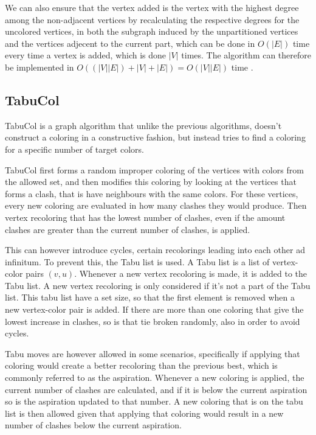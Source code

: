\documentclass[a4paper]{article}
\begin{document}
We can also ensure that the vertex added is the vertex with the highest degree among
the non-adjacent vertices by recalculating the respective degrees for the
uncolored vertices, in both the subgraph induced by the unpartitioned vertices and the vertices 
adjecent to the current part, which can be done in $O(|E|)$ time every time a vertex is
added, which is done $|V|$ times. The algorithm can therefore be implemented in
$O((|V||E|)+|V|+|E|) = O(|V||E|)$ time \cite{Constructive}.

\subsection{TabuCol}

TabuCol is a graph algorithm that unlike the previous algorithms, doesn't
construct a coloring in a constructive fashion, but instead tries to find a
coloring for a specific number of target colors.

TabuCol first forms a random improper coloring of the vertices with colors from
the allowed set, and then modifies this coloring by looking at the vertices that
forms a clash, that is have neighbours with the same colors. For these vertices,
every new coloring are evaluated in how many clashes they would produce. Then
vertex recoloring that has the lowest number of clashes, even if the amount
clashes are greater than the current number of clashes, is applied.

This can however introduce cycles, certain recolorings leading into each other
ad infinitum. To prevent this, the Tabu list is used. A Tabu list is a list of
vertex-color pairs $(v,u)$. Whenever a new vertex recoloring is made, it is
added to the Tabu list. A new vertex recoloring is only considered if it's not a
part of the Tabu list. This tabu list have a set size, so that the first element
is removed when a new vertex-color pair is added. If there are more than one
coloring that give the lowest increase in clashes, so is that tie broken
randomly, also in order to avoid cycles.

Tabu moves are however allowed in some scenarios, specifically if applying that
coloring would create a better recoloring than the previous best, which is
commonly referred to as the aspiration. Whenever a new coloring is applied, the
current number of clashes are calculated, and if it is below the current
aspiration so is the aspiration updated to that number.  A new coloring that is
on the tabu list is then allowed given that applying that coloring would result
in a new number of clashes below the current aspiration.
\end{document}
